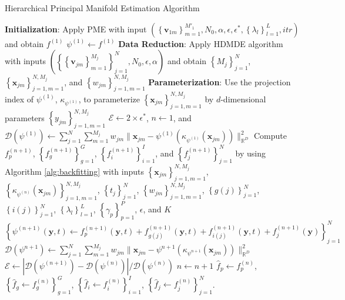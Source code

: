 \documentclass[11pt,reqno]{article}
\theoremstyle{definition}
\begin{document}
\begin{algorithm}
\caption{Hierarchical Principal Manifold Estimation Algorithm}\label{alg:hpme}
  \textbf{Initialization}: Apply PME with input $\left(\left\{\mathbf{v}_{1m}\right\}_{m=1}^{M'_1}, N_0, \alpha, \epsilon, \epsilon^{*}, \left\{\lambda_l\right\}_{l=1}^{L}, itr\right)$ and obtain $f^{(1)}$\;
  $\psi^{(1)} \gets f^{(1)}$\;
  \textbf{Data Reduction}: Apply HDMDE algorithm with inputs $\left(\left\{\left\{\mathbf{v}_{jm}\right\}_{m=1}^{M_j}\right\}_{j=1}^{N}, N_0, \epsilon, \alpha\right)$ and obtain $\left\{M_j\right\}_{j=1}^{N}$, $\left\{\mathbf{x}_{jm}\right\}_{j=1, m=1}^{N, M_j}$, and $\left\{w_{jm}\right\}_{j=1, m=1}^{N, M_j}$\;
  \textbf{Parameterization}: Use the projection index of $\psi^{(1)}$, $\kappa_{\psi^{(1)}}$, to parameterize $\left\{\mathbf{x}_{jm}\right\}_{j=1, m=1}^{N, M_j}$ by $d$-dimensional parameters $\left\{y_{jm}\right\}_{j=1, m=1}^{N, M_j}$\;
  $\mathcal{E} \gets 2 \times \epsilon^{*}$, $n \gets 1$, and $\mathcal{D}(\psi^{(1)}) \gets \sum_{j=1}^{N}\sum_{m=1}^{M_j}w_{jm}\|\mathbf{x}_{jm} - \psi^{(1)}\left(\kappa_{\psi^{(1)}}(\mathbf{x}_{jm})\right)\|_{\mathbb{R}^{D}}^2$\;
   {
    Compute $f_{p}^{(n + 1)}$, $\left\{f_{g}^{(n + 1)}\right\}_{g = 1}^{G}$, $\left\{f_{i}^{(n + 1)}\right\}_{i=1}^{I}$, and $\left\{f_{j}^{(n+1)}\right\}_{j=1}^{N}$ by using Algorithm \ref{alg:backfitting} with inputs $\left\{\mathbf{x}_{jm}\right\}_{j=1, m=1}^{N, M_j}$, $\left\{\kappa_{\psi^{(n)}}(\mathbf{x}_{jm})\right\}_{j=1, m=1}^{N, M_j}$, $\left\{t_j\right\}_{j=1}^{N}$, $\left\{w_{jm}\right\}_{j=1, m=1}^{N, M_j}$, $\left\{g(j)\right\}_{j=1}^{N}$, $\left\{i(j)\right\}_{j=1}^{N}$, $\left\{\lambda_l\right\}_{l=1}^{L}$, $\left\{\gamma_p\right\}_{p=1}^{P}$, $\epsilon$, and $K$\;
    $\left\{\psi^{(n+1)}(\mathbf{y}, t) \gets f_{p}^{(n + 1)}(\mathbf{y}, t) + f_{g(j)}^{(n+1)}(\mathbf{y}, t) + f_{i(j)}^{(n + 1)}(\mathbf{y}, t) + f_{j}^{(n+1)}(\mathbf{y})\right\}_{j=1}^{N}$\;
    $\mathcal{D}(\psi^{n+1}) \gets \sum_{j=1}^{N}\sum_{m=1}^{M_j}w_{jm}\|\mathbf{x}_{jm} - \psi^{n + 1}\left(\kappa_{\psi^{n+1}}(\mathbf{x}_{jm})\right)\|_{\mathbb{R}^{D}}^2$\;
    $\mathcal{E} \gets |\mathcal{D}(\psi^{(n+1)}) - \mathcal{D}(\psi^{(n)})| / \mathcal{D}(\psi^{(n)})$\;
    $n \gets n + 1$\;
  }
  $\hat{f}_p \gets f_{p}^{(n)}$, $\left\{\hat{f}_{g} \gets f_{g}^{(n)}\right\}_{g=1}^{G}$, $\left\{\hat{f}_{i} \gets f_{i}^{(n)}\right\}_{i=1}^{I}$, $\left\{\hat{f}_j \gets f_{j}^{(n)}\right\}_{j=1}^{N}$.
\end{algorithm}
\end{document}
